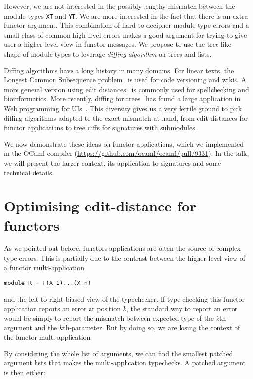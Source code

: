 \documentclass[a4paper,11pt]{scrartcl}
\begin{document}
However, we are not interested in the possibly lengthy mismatch between the module types \texttt{XT} and
\texttt{YT}. We are more interested in the fact that there is an extra functor argument.
%
This combination of hard to decipher module type errors and a small class of common high-level errors makes
a good argument for trying to give user a higher-level view in functor messages.
We propose to use the tree-like shape of module types to leverage
\emph{diffing algorithm} on trees and lists.

Diffing algorithms have a long history in many domains. For linear texts, the
Longest Common Subsequence problem~\cite{DBLP:conf/spire/BergrothHR00} is used for code versioning and wikis. A more general version
using edit distances~\cite{DBLP:journals/csur/Navarro01} is commonly used for spellchecking and bioinformatics.
More recently, diffing for trees~\cite{DBLP:journals/tcs/Bille05}
has found a large application
in Web programming for UIs~\cite{reactjs}. This diversity gives
us a very fertile ground to pick diffing algorithms adapted to the exact
mismatch at hand, from edit distances for functor applications to
tree diffs for signatures with submodules.

We now demonstrate these ideas on functor applications, which
we implemented in the OCaml compiler
(\url{https://github.com/ocaml/ocaml/pull/9331}).
In the talk, we will present the larger context, its application to signatures
and some technical details.

\section{Optimising edit-distance for functors}

As we pointed out before, functors applications are often the source
of complex type errors. This is partially due to the contrast between the higher-level view of a functor multi-application

\begin{verbatim}
module R = F(X_1)...(X_n)
\end{verbatim}

and the left-to-right biased view of the typechecker.
If type-checking this functor application reports an error at position $k$, the standard
way to report an error would be simply to report the mismatch between expected type of
the $k$th-argument and the $k$th-parameter. But by doing so, we are losing the context of the
functor multi-application.

By considering the whole list of arguments, we can find the smallest patched
argument lists that makes the multi-application typechecks. A patched argument is then either:
\end{document}
